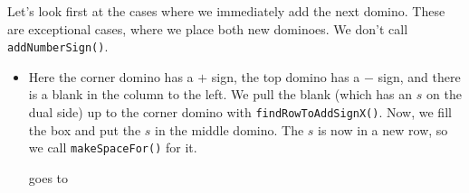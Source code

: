 \documentclass[12pt]{article}
\numberwithin{equation}{section}
\newcommand{\horizontalDominoRSShift}[4]{\filldraw [dominoRSStyle] (#2 - 1 + #4 + \eps, #1 - 1 + \eps) rectangle + (2 - \teps, 1 -\teps) node [dominoText] {$#3$};}
\newcommand{\verticalDominoRSShift}[4]{\filldraw [dominoRSStyle] (#2 - 1 + #4 + \eps,  #1 - 1 + \eps) rectangle + (1 - \teps,2 -\teps) node [dominoText] {$#3$};}
\begin{document}
\begin{itemize}
    Let's look first at the cases where we immediately add the next domino.
    These are exceptional cases, where we place both new dominoes.
    We don't call \texttt{addNumberSign()}.
    \begin{itemize}
      \item Here the corner domino has a $+$ sign, the top domino has a $-$ sign, and there is a blank in the column to the left.
      We pull the blank (which has an $s$ on the dual side) up to the corner domino with \texttt{findRowToAddSignX()}.
      Now, we fill the box and put the $s$ in the middle domino.
      The $s$ is now in a new row, so we call \texttt{makeSpaceFor()} for it.
      \begin{figure}[H]
        \centering
      \end{figure}
      goes to
      \begin{figure}[H]
        \centering
      \end{figure}


\end{itemize}
\end{itemize}
\end{document}
